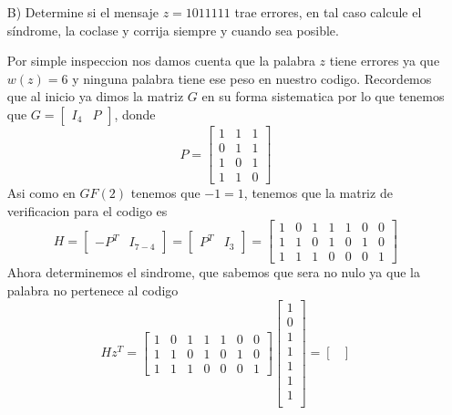\begin{itemize}
    \item[B)] Determine si el mensaje $z= 1011111$ trae errores, en tal caso calcule el síndrome, la coclase y corrija siempre y cuando sea posible.
    \begin{sols}
        Por simple inspeccion nos damos cuenta que la palabra $z$ tiene errores ya que $w(z)=6$ y ninguna palabra tiene ese peso en nuestro codigo. Recordemos que al inicio ya dimos la matriz $G$ en su forma sistematica por lo que tenemos que $G=[\begin{array}{c|c}
            I_4&P
        \end{array}]$, donde
        $$P=\begin{bmatrix}
            1 & 1 & 1 \\
            0 & 1 & 1 \\
            1 & 0 & 1 \\
            1 & 1 & 0
        \end{bmatrix}$$
        Asi como en $GF(2)$ tenemos que $-1=1$, tenemos que la matriz de verificacion para el codigo es
    $$H=[\begin{array}{c|c}
        -P^T&I_{7-4}
    \end{array}]=[\begin{array}{c|c}
        P^T&I_{3}
    \end{array}]=\begin{bmatrix}
        1 & 0 & 1 & 1 & 1 & 0 & 0 \\
        1 & 1 & 0 & 1 & 0 & 1 & 0 \\
        1 & 1 & 1 & 0 & 0 & 0 & 1
    \end{bmatrix}$$
    Ahora determinemos el sindrome, que sabemos que sera no nulo ya que la palabra no pertenece al codigo
    $$Hz^T=\begin{bmatrix}
        1 & 0 & 1 & 1 & 1 & 0 & 0 \\
        1 & 1 & 0 & 1 & 0 & 1 & 0 \\
        1 & 1 & 1 & 0 & 0 & 0 & 1
    \end{bmatrix}\begin{bmatrix}
        1\\
        0\\
        1\\
        1\\
        1\\
        1\\
        1\\
    \end{bmatrix}=\begin{bmatrix}

\end{bmatrix}$$
\end{sols}
\end{itemize}
